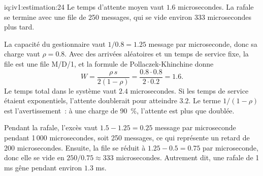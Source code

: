 \begin{solution}{iq:iv1:estimation:24}
Le temps d'attente moyen vaut $1.6$ microsecondes. La rafale se termine avec une file de 250 messages, qui se vide environ 333 microsecondes plus tard.

La capacité du gestionnaire vaut $1/0.8 = 1.25$ message par microseconde, donc sa charge vaut $\rho = 0.8$. Avec des arrivées aléatoires et un temps de service fixe, la file est une file M/D/1, et la formule de Pollaczek-Khinchine donne
\[
W = \frac{\rho\, s}{2(1 - \rho)} = \frac{0.8 \cdot 0.8}{2 \cdot 0.2} = 1.6.
\]
Le temps total dans le système vaut $2.4$ microsecondes. Si les temps de service étaient exponentiels, l'attente doublerait pour atteindre $3.2$. Le terme $1/(1 - \rho)$ est l'avertissement~: à une charge de 90~\%, l'attente est plus que doublée.

Pendant la rafale, l'excès vaut $1.5 - 1.25 = 0.25$ message par microseconde pendant 1\,000 microsecondes, soit 250 messages, ce qui représente un retard de 200 microsecondes. Ensuite, la file se réduit à $1.25 - 0.5 = 0.75$ par microseconde, donc elle se vide en $250/0.75 \approx 333$ microsecondes. Autrement dit, une rafale de 1 ms gêne pendant environ $1.3$ ms.

\end{solution}

